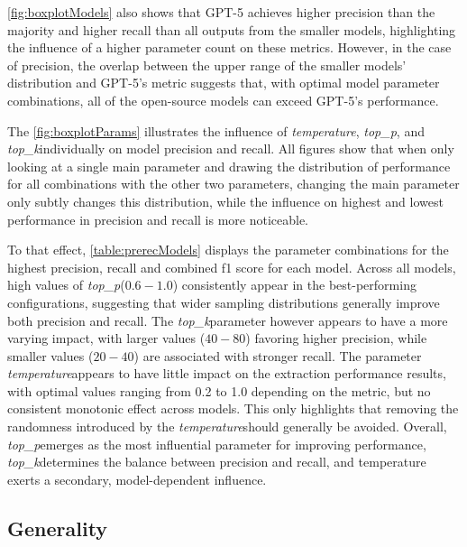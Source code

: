 \documentclass[bs, english]{stthesis}
\newcommand{\temperature}{{\textit{temperature}}}
\newcommand{\topP}{{\textit{top\_p}}}
\newcommand{\topK}{{\textit{top\_k}}}
\begin{document}
\cref{fig:boxplotModels} also shows that GPT-5 achieves higher precision than the majority and higher recall than all outputs from the smaller models, highlighting the influence of a higher parameter count on these metrics. However, in the case of precision, the overlap between the upper range of the smaller models' distribution and GPT-5's metric suggests that, with optimal model parameter combinations, all of the open-source models can exceed GPT-5's performance.


The \cref{fig:boxplotParams} illustrates the influence of \temperature, \topP, and \topK individually on model precision and recall. All figures show that when only looking at a single main parameter and drawing the distribution of performance for all combinations with the other two parameters, changing the main parameter only subtly changes this distribution, while the influence on highest and lowest performance in precision and recall is more noticeable.

To that effect, \cref{table:prerecModels} displays the parameter combinations for the highest precision, recall and combined f1 score for each model.
Across all models, high values of \topP ($0.6-1.0$) consistently appear in the best-performing configurations, suggesting that wider sampling distributions generally improve both precision and recall. The \topK parameter however appears to have a more varying impact, with larger values ($40-8$0) favoring higher precision, while smaller values ($20-40$) are associated with stronger recall. The parameter \temperature appears to have little impact on the extraction performance results, with optimal values ranging from 0.2 to 1.0 depending on the metric, but no consistent monotonic effect across models. This only highlights that removing the randomness introduced by the \temperature should generally be avoided. Overall, \topP emerges as the most influential parameter for improving performance, \topK determines the balance between precision and recall, and temperature exerts a secondary, model-dependent influence.

\subsection{Generality}
\end{document}
